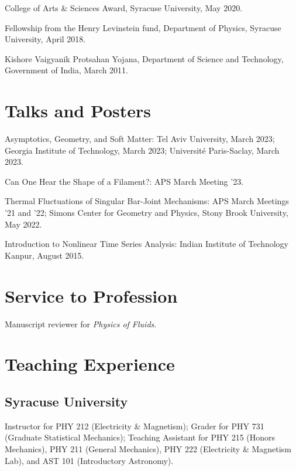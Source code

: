 \documentclass[10pt,a4paper,article,oneside]{memoir}
\def\nohangpars{%
  \leftskip=0pt%
  \parindent=0pt%
  \setsecindent{0pt}%
  \setsubsecindent{0pt}%
}
\begin{document}
College of Arts \& Sciences Award, Syracuse University, May 2020.

Fellowship from the Henry Levinstein fund, Department of Physics, Syracuse University, April 2018.

Kishore Vaigyanik Protsahan Yojana, Department of Science and Technology, Government of India, March 2011.


\section{Talks and Posters}

Asymptotics, Geometry, and Soft Matter: Tel Aviv University, March 2023; Georgia Institute of Technology, March 2023; Universit\'{e} Paris-Saclay, March 2023.

Can One Hear the Shape of a Filament?: APS March Meeting '23.

Thermal Fluctuations of Singular Bar-Joint Mechanisms: APS March Meetings '21 and '22; Simons Center for Geometry and Physics, Stony Brook University, May 2022.

Introduction to Nonlinear Time Series Analysis: Indian Institute of Technology Kanpur, August 2015.


\nohangpars

\section{Service to Profession}

Manuscript reviewer for \emph{Physics of Fluids}.


\section{Teaching Experience}

\subsection{Syracuse University}

Instructor for PHY 212 (Electricity \& Magnetism); Grader for PHY 731 (Graduate Statistical Mechanics); Teaching Assistant for PHY 215 (Honors Mechanics), PHY 211 (General Mechanics), PHY 222 (Electricity \& Magnetism Lab), and AST 101 (Introductory Astronomy).
\end{document}
